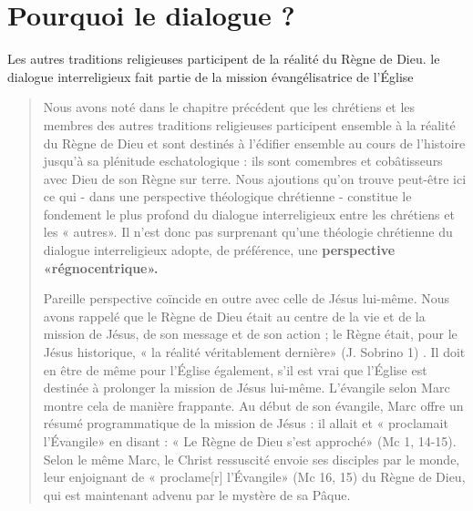 \chapter{Pourquoi le dialogue ? }



\begin{Synthesis}
Les autres traditions religieuses participent de la réalité du Règne de Dieu.
le dialogue interreligieux
fait partie de la mission évangélisatrice de l’Église
\end{Synthesis}

\begin{quote}

Nous avons noté dans le chapitre précédent que les chrétiens
et les membres des autres traditions religieuses participent
ensemble à la réalité du Règne de Dieu et sont destinés à
l'édifier ensemble au cours de l'histoire jusqu'à sa plénitude
eschatologique : ils sont comembres et cobâtisseurs avec Dieu
de son Règne sur terre. Nous ajoutions qu'on trouve peut-être
ici ce qui - dans une perspective théologique chrétienne -
constitue le fondement le plus profond du dialogue interreligieux
entre les chrétiens et les « autres». Il n'est donc pas surprenant
qu'une théologie chrétienne du dialogue interreligieux
adopte, de préférence, une \textbf{perspective «régnocentrique».}


Pareille perspective coïncide en outre avec celle de Jésus
lui-même. Nous avons rappelé que le Règne de Dieu était au
centre de la vie et de la mission de Jésus, de son message et
de son action ; le Règne était, pour le Jésus historique, « la réalité
véritablement dernière» (J. Sobrino 1) . Il doit en être de
même pour l'Église également, s'il est vrai que l'Église est
destinée à prolonger la mission de Jésus lui-même. L'évangile
selon Marc montre cela de manière frappante. Au début de son
évangile, Marc offre un résumé programmatique de la mission
de Jésus : il allait et « proclamait l'Évangile» en disant : « Le
Règne de Dieu s'est approché» (Mc 1, 14-15). Selon le même
Marc, le Christ ressuscité envoie ses disciples par le monde,
leur enjoignant de « proclame[r] l'Évangile» (Mc 16, 15) du Règne de Dieu, qui est maintenant advenu par le mystère de
sa Pâque.



\end{quote}
